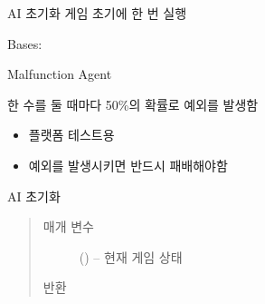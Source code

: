 \documentclass[letterpaper,10pt,english]{sphinxmanual}
\begin{document}
\begin{fulllineitems}
\begin{fulllineitems}
\end{fulllineitems}


\begin{fulllineitems}
\label{\detokenize{agents.basic:agents.basic.debug_agent.FirstMoveAgent.reset}}
AI 초기화
게임 초기에 한 번 실행

\end{fulllineitems}


\end{fulllineitems}


\begin{fulllineitems}
\label{\detokenize{agents.basic:agents.basic.debug_agent.MalfunctionAgent}}
Bases: {\hyperref[\detokenize{agents:agents.BaseAgent}]{}}

Malfunction Agent

한 수를 둘 때마다 50\%의 확률로 예외를 발생함
\begin{itemize}
\item {} 
플랫폼 테스트용

\item {} 
예외를 발생시키면 반드시 패배해야함

\end{itemize}

\begin{fulllineitems}
\label{\detokenize{agents.basic:agents.basic.debug_agent.MalfunctionAgent.act}}
AI 초기화
\begin{quote}\begin{description}
\item[{매개 변수}] \leavevmode
{} ({\hyperref[\detokenize{scripts:scripts.run_game.State}]{}}) -- 현재 게임 상태

\item[{반환}] \leavevmode


\end{description}
\end{quote}
\end{fulllineitems}
\end{fulllineitems}
\end{document}
